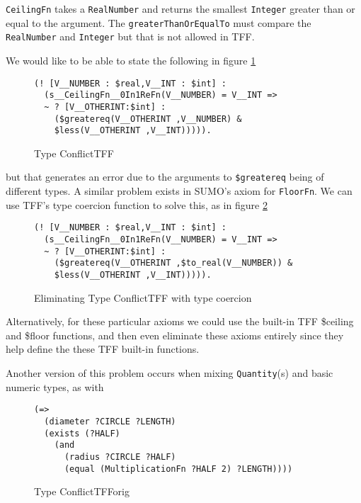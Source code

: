 \documentclass{article}
\begin{document}
\texttt{CeilingFn} takes a \texttt{RealNumber} and returns the smallest \texttt{Integer} 
greater than or equal to the argument.  The \texttt{greaterThanOrEqualTo} must
compare the \texttt{RealNumber} and \texttt{Integer} but that is not allowed in TFF.

We would like to be able to state the following in figure \ref{fig:TypeConflictTFF}

\begin{figure}[H]
\begin{framed}
\begin{verbatim}
(! [V__NUMBER : $real,V__INT : $int] : 
  (s__CeilingFn__0In1ReFn(V__NUMBER) = V__INT => 
  ~ ? [V__OTHERINT:$int] : 
    ($greatereq(V__OTHERINT ,V__NUMBER) & 
    $less(V__OTHERINT ,V__INT))))).
\end{verbatim}
\end{framed}
\caption{Type ConflictTFF}
\label{fig:TypeConflictTFF}
\end{figure}

but that generates an error due to the arguments to \texttt{\$greatereq} being of
different types.  A similar problem exists in SUMO's axiom for \texttt{FloorFn}.   
We can use TFF's type coercion function to solve this, as in figure \ref{fig:TypeConflictTFFcoerce}

\begin{figure}[H]
\begin{framed}
\begin{verbatim}
(! [V__NUMBER : $real,V__INT : $int] : 
  (s__CeilingFn__0In1ReFn(V__NUMBER) = V__INT => 
  ~ ? [V__OTHERINT:$int] : 
    ($greatereq(V__OTHERINT ,$to_real(V__NUMBER)) & 
    $less(V__OTHERINT ,V__INT))))).
\end{verbatim}
\end{framed}
\caption{Eliminating Type ConflictTFF with type coercion}
\label{fig:TypeConflictTFFcoerce}
\end{figure}

Alternatively, for these particular axioms we could use the built-in TFF
\$ceiling and \$floor functions, and then even eliminate these axioms entirely
since they help define the these TFF built-in functions.

Another version of this problem occurs when mixing \texttt{Quantity}(s) and
basic numeric types, as with

\begin{figure}[H]
\begin{framed}
\begin{verbatim}
(=> 
  (diameter ?CIRCLE ?LENGTH) 
  (exists (?HALF) 
    (and 
      (radius ?CIRCLE ?HALF) 
      (equal (MultiplicationFn ?HALF 2) ?LENGTH))))
\end{verbatim}
\end{framed}
\caption{Type ConflictTFForig}
\label{fig:ConflictTFForig}
\end{figure}
\end{document}
